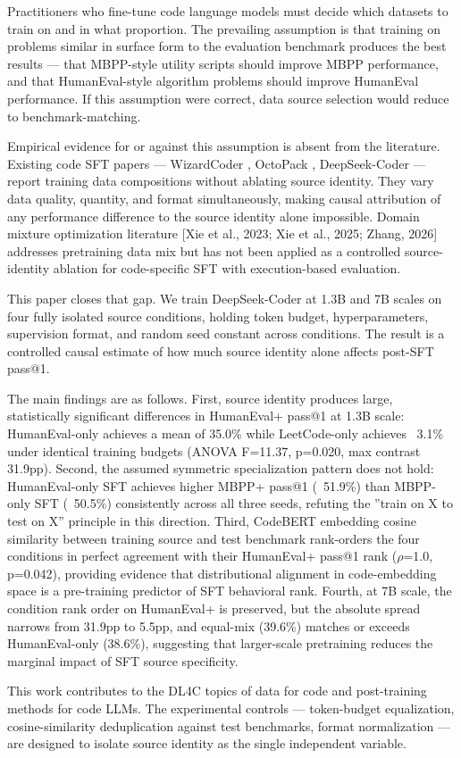 
Practitioners who fine-tune code language models must decide which datasets to train on and in what proportion. The prevailing assumption is that training on problems similar in surface form to the evaluation benchmark produces the best results --- that MBPP-style utility scripts should improve MBPP performance, and that HumanEval-style algorithm problems should improve HumanEval performance. If this assumption were correct, data source selection would reduce to benchmark-matching.

Empirical evidence for or against this assumption is absent from the literature. Existing code SFT papers --- WizardCoder \citep{Luo2023WizardCoder}, OctoPack \citep{Muennighoff2023OctoPack}, DeepSeek-Coder \citep{Guo2024DeepSeekCoder} --- report training data compositions without ablating source identity. They vary data quality, quantity, and format simultaneously, making causal attribution of any performance difference to the source identity alone impossible. Domain mixture optimization literature [Xie et al., 2023; Xie et al., 2025; Zhang, 2026] addresses pretraining data mix but has not been applied as a controlled source-identity ablation for code-specific SFT with execution-based evaluation.

This paper closes that gap. We train DeepSeek-Coder at 1.3B and 7B scales on four fully isolated source conditions, holding token budget, hyperparameters, supervision format, and random seed constant across conditions. The result is a controlled causal estimate of how much source identity alone affects post-SFT pass@1.

The main findings are as follows. First, source identity produces large, statistically significant differences in HumanEval+ pass@1 at 1.3B scale: HumanEval-only achieves a mean of 35.0\% while LeetCode-only achieves ~3.1\% under identical training budgets (ANOVA F=11.37, p=0.020, max contrast 31.9pp). Second, the assumed symmetric specialization pattern does not hold: HumanEval-only SFT achieves higher MBPP+ pass@1 (~51.9\%) than MBPP-only SFT (~50.5\%) consistently across all three seeds, refuting the ''train on X to test on X'' principle in this direction. Third, CodeBERT embedding cosine similarity between training source and test benchmark rank-orders the four conditions in perfect agreement with their HumanEval+ pass@1 rank ($\rho$=1.0, p=0.042), providing evidence that distributional alignment in code-embedding space is a pre-training predictor of SFT behavioral rank. Fourth, at 7B scale, the condition rank order on HumanEval+ is preserved, but the absolute spread narrows from 31.9pp to 5.5pp, and equal-mix (39.6\%) matches or exceeds HumanEval-only (38.6\%), suggesting that larger-scale pretraining reduces the marginal impact of SFT source specificity.

This work contributes to the DL4C topics of data for code and post-training methods for code LLMs. The experimental controls --- token-budget equalization, cosine-similarity deduplication against test benchmarks, format normalization --- are designed to isolate source identity as the single independent variable.

